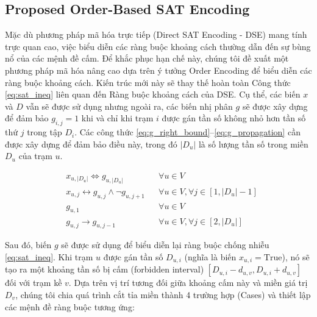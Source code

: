 \documentclass[letterpaper,journal]{IEEEtran}
\begin{document}
\subsection{Proposed Order-Based SAT Encoding}
Mặc dù phương pháp mã hóa trực tiếp (Direct SAT Encoding - DSE) mang tính trực quan cao, việc biểu diễn các ràng buộc khoảng cách thường dẫn đến sự bùng nổ của các mệnh đề cấm. Để khắc phục hạn chế này, chúng tôi đề xuất một phương pháp mã hóa nâng cao dựa trên ý tưởng Order Encoding \cite{Petke2011Order_encoding} để biểu diễn các ràng buộc khoảng cách. Kiến trúc mới này sẽ thay thế hoàn toàn Công thức \eqref{eq:sat_ineq} liên quan đến Ràng buộc khoảng cách của DSE. 
Cụ thể, các biến $x$ và $D$ vẫn sẽ được sử dụng nhưng ngoài ra, các biến nhị phân $g$ sẽ được xây dựng để đảm bảo $g_{i,j} = 1$ khi và chỉ khi trạm $i$ được gán tần số không nhỏ hơn tần số thứ $j$ trong tập $D_i$. 
Các công thức \eqref{eq:g_right_bound}--\eqref{eq:g_propagation} cần được xây dựng để đảm bảo điều này, trong đó $|D_u|$ là số lượng tần số trong miền $D_u$ của trạm $u$. 

\begin{align}
    & x_{u,|D_u|} \Leftrightarrow g_{u,|D_u|} && \forall u \in V \label{eq:g_right_bound}\\
    & x_{u,j} \leftrightarrow g_{u,j} \wedge \neg g_{u,j+1} && \forall u \in V, \forall j \in [1, |D_u|-1] \label{eq:g_x_g_connect}\\
    & g_{u,1} && \forall u \in V \label{eq:g_left_bound}\\
    & g_{u,j} \rightarrow g_{u,j-1} && \forall u \in V, \forall j \in [2, |D_u|] \label{eq:g_propagation}
\end{align}


Sau đó, biến $g$ sẽ được sử dụng để biểu diễn lại ràng buộc chống nhiễu \eqref{eq:sat_ineq}. Khi trạm $u$ được gán tần số $D_{u,i}$ (nghĩa là biến $x_{u,i} = \text{True}$), nó sẽ tạo ra một khoảng tần số bị cấm (forbidden interval) $[D_{u,i} - d_{u,v}, D_{u,i} + d_{u,v}]$ đối với trạm kề $v$. Dựa trên vị trí tương đối giữa khoảng cấm này và miền giá trị $D_v$, chúng tôi chia quá trình cắt tỉa miền thành 4 trường hợp (Cases) và thiết lập các mệnh đề ràng buộc tương ứng:
\end{document}
